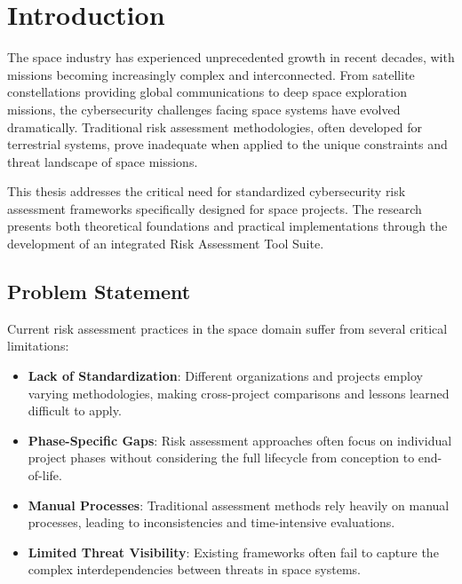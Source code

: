 \documentclass[binding=0.6cm]{sapthesis}
\begin{document}
\tableofcontents
\listoffigures
\listoftables

\mainmatter

\chapter{Introduction}
\label{ch:introduction}

The space industry has experienced unprecedented growth in recent decades, with missions becoming increasingly complex and interconnected. From satellite constellations providing global communications to deep space exploration missions, the cybersecurity challenges facing space systems have evolved dramatically. Traditional risk assessment methodologies, often developed for terrestrial systems, prove inadequate when applied to the unique constraints and threat landscape of space missions.

This thesis addresses the critical need for standardized cybersecurity risk assessment frameworks specifically designed for space projects. The research presents both theoretical foundations and practical implementations through the development of an integrated Risk Assessment Tool Suite.

\section{Problem Statement}

Current risk assessment practices in the space domain suffer from several critical limitations:

\begin{itemize}
    \item \textbf{Lack of Standardization}: Different organizations and projects employ varying methodologies, making cross-project comparisons and lessons learned difficult to apply.
    \item \textbf{Phase-Specific Gaps}: Risk assessment approaches often focus on individual project phases without considering the full lifecycle from conception to end-of-life.
    \item \textbf{Manual Processes}: Traditional assessment methods rely heavily on manual processes, leading to inconsistencies and time-intensive evaluations.
    \item \textbf{Limited Threat Visibility}: Existing frameworks often fail to capture the complex interdependencies between threats in space systems.
\end{itemize}
\end{document}
